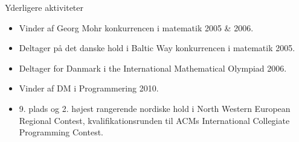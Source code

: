 \documentclass[11pt,oneside]{article}
\newenvironment{ressection}[1]{
	\vspace{4pt}
	{\fontfamily{phv}\selectfont\Large#1}
	\begin{itemize}
	\vspace{3pt}
}{
	\end{itemize}
}
\newcommand{\resitem}[1]{
	\vspace{-4pt}
	\item \begin{flushleft} #1 \end{flushleft}
}
\begin{document}

\begin{ressection}{Yderligere aktiviteter}

	\resitem{Vinder af Georg Mohr konkurrencen i matematik 2005 \& 2006.}
	
	\resitem{Deltager på det danske hold i Baltic Way konkurrencen i matematik 2005.}
	
	\resitem{Deltager for Danmark i the International Mathematical Olympiad 2006.}

    \resitem{Vinder af DM i Programmering 2010.}

    \resitem{9. plads og 2. højest rangerende nordiske hold i North Western European Regional Contest,
             kvalifikationsrunden til ACMs International Collegiate Programming Contest.}

\end{ressection}
\end{document}
